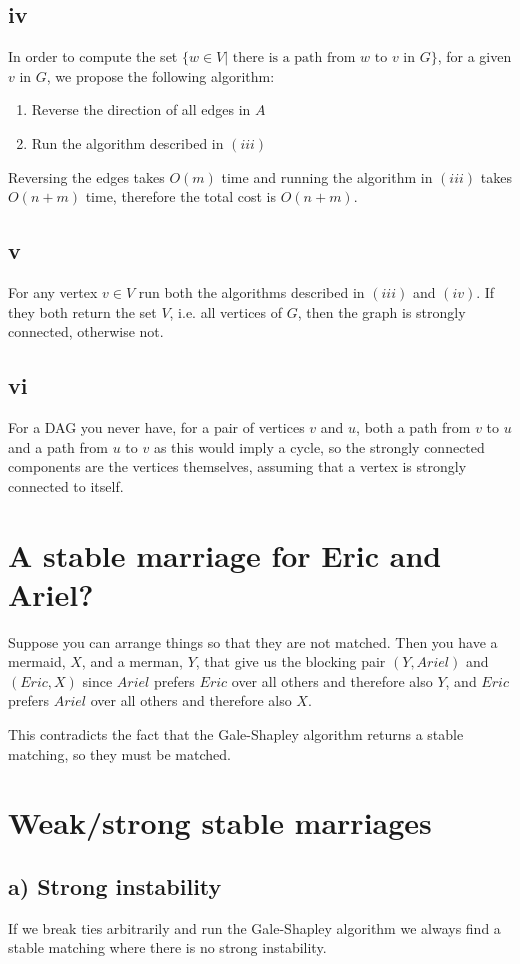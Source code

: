 \documentclass[a4paper]{article}
\begin{document}
\subsection*{iv}
In order to compute the set $\{w \in V | \mbox{ there is a path from $w$ to $v$ in $G$}\}$, for a given $v$ in $G$, we propose the following algorithm:
\begin{enumerate}
  \item Reverse the direction of all edges in $A$
  \item Run the algorithm described in $(iii)$
\end{enumerate}
Reversing the edges takes $O(m)$ time and running the algorithm in $(iii)$ takes $O(n+m)$ time, therefore the total cost is $O(n+m)$.
\subsection*{v}
For any vertex $v \in V$ run both the algorithms described in $(iii)$ and $(iv)$. If they both return the set $V$, i.e. all vertices of $G$, then the graph is strongly connected, otherwise not.
\subsection*{vi}
For a DAG you never have, for a pair of vertices $v$ and $u$, both a path from $v$ to $u$ and a path from $u$ to $v$ as this would imply a cycle, so the strongly connected components are the vertices themselves, assuming that a vertex is strongly connected to itself.

\section{A stable marriage for Eric and Ariel?}
Suppose you can arrange things so that they are not matched. Then you have a mermaid, $X$, and a merman, $Y$, that give us the blocking pair $(Y, Ariel)$ and $(Eric, X)$ since $Ariel$ prefers $Eric$ over all others and therefore also $Y$, and $Eric$ prefers $Ariel$ over all others and therefore also $X$.

This contradicts the fact that the Gale-Shapley algorithm returns a stable matching, so they must be matched.

\section{Weak/strong stable marriages}
\subsection*{a) Strong instability}
If we break ties arbitrarily and run the Gale-Shapley algorithm we always find a stable matching where there is no strong instability. \\
\end{document}
